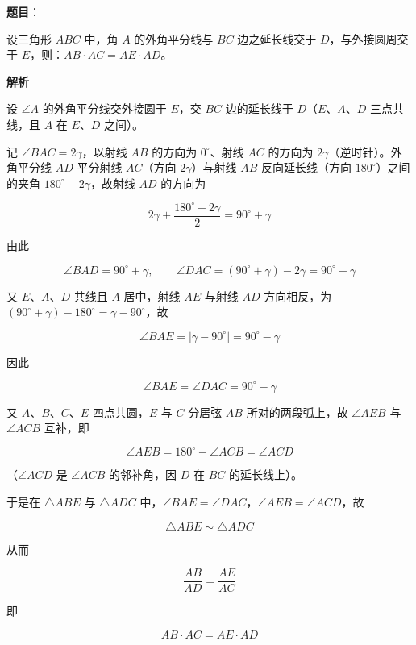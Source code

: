 \begin{answer}

\textbf{题目}：

设三角形 $ABC$ 中，角 $A$ 的外角平分线与 $BC$ 边之延长线交于 $D$，与外接圆周交于 $E$，则：$AB\cdot AC=AE\cdot AD$。

\textbf{解析}
\nopagebreak[4]
\begin{center}\end{center}
\nopagebreak[4]
设 $\angle A$ 的外角平分线交外接圆于 $E$，交 $BC$ 边的延长线于 $D$（$E$、$A$、$D$ 三点共线，且 $A$ 在 $E$、$D$ 之间）。

记 $\angle BAC=2\gamma$，以射线 $AB$ 的方向为 $0^\circ$、射线 $AC$ 的方向为 $2\gamma$（逆时针）。外角平分线 $AD$ 平分射线 $AC$（方向 $2\gamma$）与射线 $AB$ 反向延长线（方向 $180^\circ$）之间的夹角 $180^\circ-2\gamma$，故射线 $AD$ 的方向为

\nopagebreak[4]
\[
2\gamma+\frac{180^\circ-2\gamma}{2}=90^\circ+\gamma
\]

由此

\nopagebreak[4]
\[
\angle BAD=90^\circ+\gamma,\qquad \angle DAC=(90^\circ+\gamma)-2\gamma=90^\circ-\gamma
\]

又 $E$、$A$、$D$ 共线且 $A$ 居中，射线 $AE$ 与射线 $AD$ 方向相反，为 $(90^\circ+\gamma)-180^\circ=\gamma-90^\circ$，故

\nopagebreak[4]
\[
\angle BAE=|\gamma-90^\circ|=90^\circ-\gamma
\]

因此

\nopagebreak[4]
\[
\angle BAE=\angle DAC=90^\circ-\gamma
\]

又 $A$、$B$、$C$、$E$ 四点共圆，$E$ 与 $C$ 分居弦 $AB$ 所对的两段弧上，故 $\angle AEB$ 与 $\angle ACB$ 互补，即

\nopagebreak[4]
\[
\angle AEB=180^\circ-\angle ACB=\angle ACD
\]

（$\angle ACD$ 是 $\angle ACB$ 的邻补角，因 $D$ 在 $BC$ 的延长线上）。

于是在 $\triangle ABE$ 与 $\triangle ADC$ 中，$\angle BAE=\angle DAC$，$\angle AEB=\angle ACD$，故

\nopagebreak[4]
\[
\triangle ABE\sim\triangle ADC
\]

从而

\nopagebreak[4]
\[
\frac{AB}{AD}=\frac{AE}{AC}
\]

即

\nopagebreak[4]
\[
AB\cdot AC=AE\cdot AD
\]


\end{answer}
